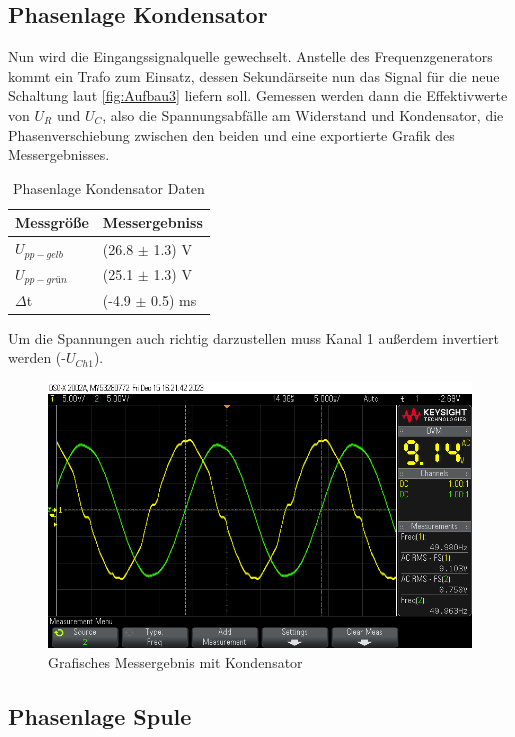 \documentclass[12pt,a4paper,twoside]{article}
\begin{document}
\subsection{Phasenlage Kondensator}

Nun wird die Eingangssignalquelle gewechselt. Anstelle des Frequenzgenerators kommt ein Trafo zum Einsatz, dessen Sekundärseite nun das Signal für die neue Schaltung laut \ref{fig:Aufbau3} liefern soll.
Gemessen werden dann die Effektivwerte von $U_{R}$ und $U_{C}$, also die Spannungsabfälle am Widerstand und Kondensator, die Phasenverschiebung zwischen den beiden und eine exportierte Grafik des Messergebnisses.

\begin{table}[H]
    \centering
    \caption{Phasenlage Kondensator Daten}
    \label{tab:Daten3}
    \begin{tabular}{| l | l |}
        \hline
        Messgröße & Messergebniss \\
        \hline
        $U_{pp-gelb}$ & (26.8 $\pm$ 1.3) V \\
        $U_{pp-grün}$ & (25.1 $\pm$ 1.3) V \\
        $\Delta$t & (-4.9 $\pm$ 0.5) ms \\
        \hline
    \end{tabular}
\end{table}

\noindent
Um die Spannungen auch richtig darzustellen muss Kanal 1 außerdem invertiert werden (-$U_{Ch1}$). 

\begin{figure}[H]
    \centering
    \includegraphics[width=0.6\linewidth]{nudes/PhaseLeistung/Aufgabe3/scope_3.png}
    \caption{Grafisches Messergebnis mit Kondensator}
    \label{fig:MessergebnisGrafischKondensator}
\end{figure}


\subsection{Phasenlage Spule}
\end{document}
